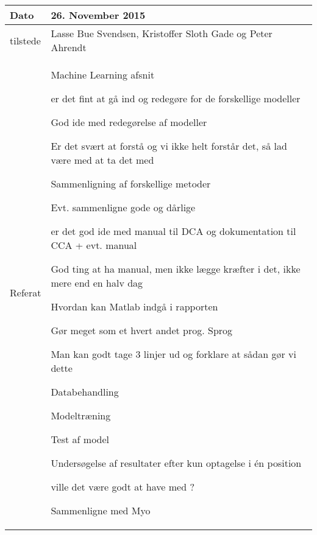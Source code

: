 \begin{center}
	\begin{tabular}{| l | p{10cm} |}
		\hline
		Dato		& 26. November 2015\\ \hline
		tilstede 	& Lasse Bue Svendsen, Kristoffer Sloth Gade og Peter Ahrendt\\ \hline
		Referat		& \vspace{-5mm}\begin{myEnumerate}
			\item Machine Learning afsnit
			\begin{myItemize}				
				\item er det fint at gå ind og redegøre for de forskellige modeller
				\begin{myItemize}
					\item God ide med redegørelse af modeller
					\item Er det svært at forstå og vi ikke helt forstår det, så lad være med at ta det med
					\item Sammenligning af forskellige metoder
				\end{myItemize}
				\item Evt. sammenligne gode og dårlige
			\end{myItemize}
			\item er det god ide med manual til DCA og dokumentation til CCA + evt. manual
			\begin{myItemize}
				\item God ting at ha manual, men ikke lægge kræfter i det, ikke mere end en halv dag
			\end{myItemize}
			\item Hvordan kan Matlab indgå i rapporten
			\begin{myItemize}
				\item Gør meget som et hvert andet prog. Sprog
				\item Man kan godt tage 3 linjer ud og forklare at sådan gør vi dette
				\item Databehandling
				\item Modeltræning
				\item Test af model
			\end{myItemize}
			\item Undersøgelse af resultater efter kun optagelse i én position
			\begin{myItemize}
				\item ville det være godt at have med ?
				\item Sammenligne med Myo
			\end{myItemize}
		\end{myEnumerate}\\ 	
		\hline
	\end{tabular}
\end{center}

